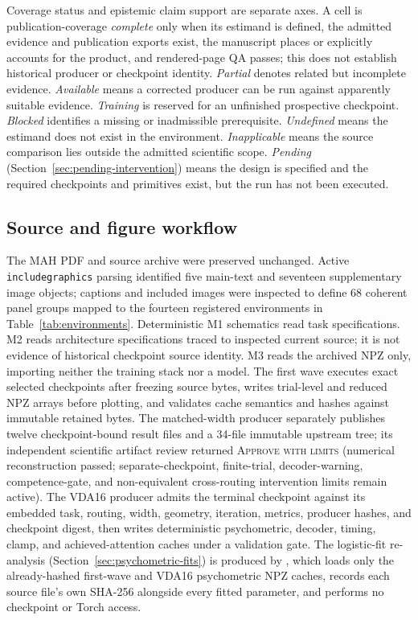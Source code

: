 \documentclass[11pt,a4paper]{article}
\begin{document}
Coverage status and epistemic claim support are separate axes. A cell is publication-coverage \emph{complete} only when its estimand is defined, the admitted evidence and publication exports exist, the manuscript places or explicitly accounts for the product, and rendered-page QA passes; this does not establish historical producer or checkpoint identity. \emph{Partial} denotes related but incomplete evidence. \emph{Available} means a corrected producer can be run against apparently suitable evidence. \emph{Training} is reserved for an unfinished prospective checkpoint. \emph{Blocked} identifies a missing or inadmissible prerequisite. \emph{Undefined} means the estimand does not exist in the environment. \emph{Inapplicable} means the source comparison lies outside the admitted scientific scope. \emph{Pending} (Section~\ref{sec:pending-intervention}) means the design is specified and the required checkpoints and primitives exist, but the run has not been executed.

\subsection{Source and figure workflow}\label{sec:source-workflow}
The MAH PDF and source archive were preserved unchanged. Active \verb|includegraphics| parsing identified five main-text and seventeen supplementary image objects; captions and included images were inspected to define 68 coherent panel groups mapped to the fourteen registered environments in Table~\ref{tab:environments}. Deterministic M1 schematics read task specifications. M2 reads architecture specifications traced to inspected current source; it is not evidence of historical checkpoint source identity. M3 reads the archived NPZ only, importing neither the training stack nor a model. The first wave executes exact selected checkpoints after freezing source bytes, writes trial-level and reduced NPZ arrays before plotting, and validates cache semantics and hashes against immutable retained bytes. The matched-width producer separately publishes twelve checkpoint-bound result files and a 34-file immutable upstream tree; its independent scientific artifact review returned \textsc{Approve with limits} (numerical reconstruction passed; separate-checkpoint, finite-trial, decoder-warning, competence-gate, and non-equivalent cross-routing intervention limits remain active). The VDA16 producer admits the terminal checkpoint against its embedded task, routing, width, geometry, iteration, metrics, producer hashes, and checkpoint digest, then writes deterministic psychometric, decoder, timing, clamp, and achieved-attention caches under a validation gate. The logistic-fit re-analysis (Section~\ref{sec:psychometric-fits}) is produced by , which loads only the already-hashed first-wave and VDA16 psychometric NPZ caches, records each source file's own SHA-256 alongside every fitted parameter, and performs no checkpoint or Torch access.
\end{document}
